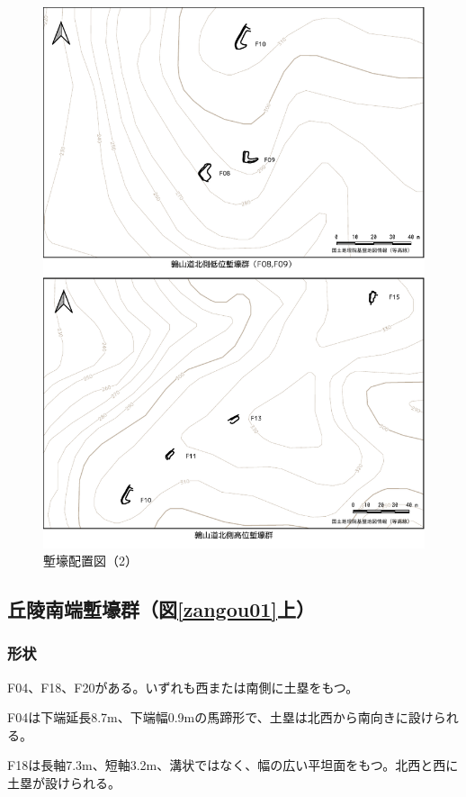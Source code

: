 \documentclass[11pt,report]{jsarticle}
\begin{document}
\begin{figure}[ht]
\centering
\includegraphics[width=160truemm]{../02fig/05zangou02.pdf}
\caption{塹壕配置図（2）}
\label{zangou02}
\end{figure}

\subsection{丘陵南端塹壕群（図\ref{zangou01}上）}
\subsubsection*{形状}
F04、F18、F20がある。いずれも西または南側に土塁をもつ。

F04は下端延長8.7m、下端幅0.9mの馬蹄形で、土塁は北西から南向きに設けられる。

F18は長軸7.3m、短軸3.2m、溝状ではなく、幅の広い平坦面をもつ。北西と西に土塁が設けられる。
\end{document}
